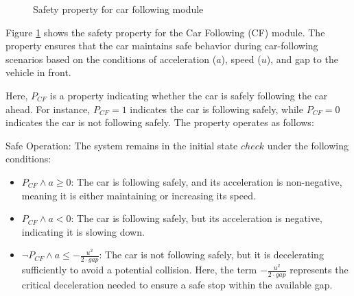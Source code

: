 \begin{figure}[htbp]
\centering
{}
\caption{Safety property for car following module}
\label{fig:cf_property}
\end{figure}


Figure \ref{fig:cf_property} shows the safety property for the Car Following (CF) module. The property ensures that the car maintains safe behavior during car-following scenarios based on the conditions of acceleration ($a$), speed ($u$), and gap to the vehicle in front.

Here, $P_{CF}$ is a property indicating whether the car is safely following the car ahead. For instance, $P_{CF}=1$ indicates the car is following safely, while $P_{CF}=0$ indicates the car is not following safely. The property operates as follows:

Safe Operation: The system remains in the initial state $check$ under the following conditions:
  \begin{itemize}
    \item $P_{CF} \land a \geq 0$: The car is following safely, and its acceleration is non-negative, meaning it is either maintaining or increasing its speed.
    \item $P_{CF} \land a < 0$: The car is following safely, but its acceleration is negative, indicating it is slowing down.
    \item $\neg P_{CF} \land a \leq -\frac{u^2}{2 \cdot gap}$: The car is not following safely, but it is decelerating sufficiently to avoid a potential collision. Here, the term $-\frac{u^2}{2 \cdot gap}$ represents the critical deceleration needed to ensure a safe stop within the available gap.
  \end{itemize}

